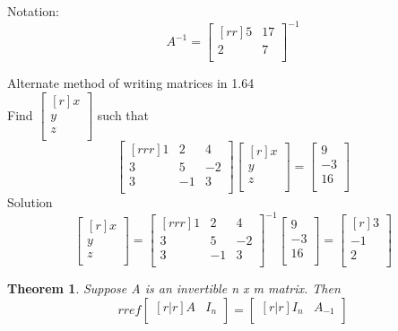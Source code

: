 \documentclass{report}
\newtheorem*{thrm}{Theorem}
\begin{document}
Notation:
\[ 
A^{-1} = \begin{bmatrix}[rr]
5 & 17\\
2 & 7\\
\end{bmatrix} ^{-1}
\]

Alternate method of writing matrices in 1.64\\
Find $\begin{bmatrix}[r] x\\ y\\ z\\ \end{bmatrix}$ such that
\[
\begin{bmatrix}[rrr] 1 & 2 & 4\\ 3 & 5 & -2\\ 3 & -1 & 3\\ \end{bmatrix}
\begin{bmatrix}[r] x\\ y\\ z\\ \end{bmatrix}
=
\begin{bmatrix} 9\\ -3\\ 16\\ \end{bmatrix}
\]
Solution
\[
\begin{bmatrix}[r] x\\ y\\ z\\ \end{bmatrix}
=
\begin{bmatrix}[rrr] 1 & 2 & 4\\ 3 & 5 & -2\\ 3 & -1 & 3\\ \end{bmatrix}^{-1}
\begin{bmatrix} 9\\ -3\\ 16\\ \end{bmatrix}
=
\begin{bmatrix}[r] 3\\ -1\\ 2\\ \end{bmatrix}
\]

\begin{thrm} Suppose A is an invertible n x m matrix. Then
\[ rref\begin{bmatrix}[r|r] A & I_n\\ \end{bmatrix}
=
\begin{bmatrix}[r|r] I_n & A_{-1}\\ \end{bmatrix}
\]
\end{thrm}
\end{document}
